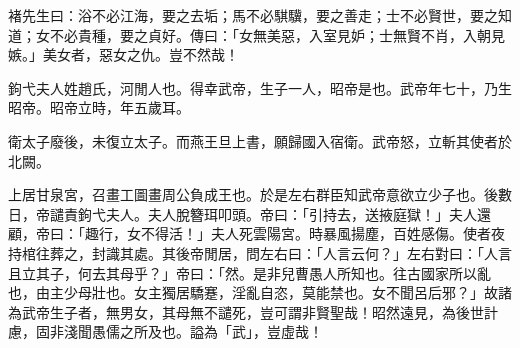 \begin{pinyinscope}
褚先生曰：浴不必江海，要之去垢；馬不必騏驥，要之善走；士不必賢世，要之知道；女不必貴種，要之貞好。傳曰：「女無美惡，入室見妒；士無賢不肖，入朝見嫉。」美女者，惡女之仇。豈不然哉！

鉤弋夫人姓趙氏，河閒人也。得幸武帝，生子一人，昭帝是也。武帝年七十，乃生昭帝。昭帝立時，年五歲耳。

衛太子廢後，未復立太子。而燕王旦上書，願歸國入宿衛。武帝怒，立斬其使者於北闕。

上居甘泉宮，召畫工圖畫周公負成王也。於是左右群臣知武帝意欲立少子也。後數日，帝譴責鉤弋夫人。夫人脫簪珥叩頭。帝曰：「引持去，送掖庭獄！」夫人還顧，帝曰：「趣行，女不得活！」夫人死雲陽宮。時暴風揚塵，百姓感傷。使者夜持棺往葬之，封識其處。其後帝閒居，問左右曰：「人言云何？」左右對曰：「人言且立其子，何去其母乎？」帝曰：「然。是非兒曹愚人所知也。往古國家所以亂也，由主少母壯也。女主獨居驕蹇，淫亂自恣，莫能禁也。女不聞呂后邪？」故諸為武帝生子者，無男女，其母無不譴死，豈可謂非賢聖哉！昭然遠見，為後世計慮，固非淺聞愚儒之所及也。謚為「武」，豈虛哉！


\end{pinyinscope}